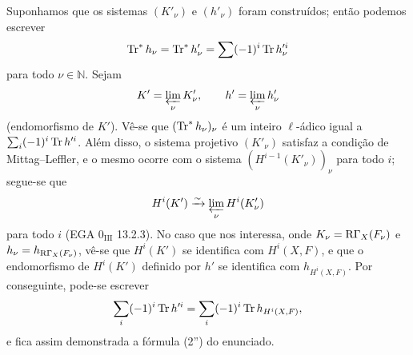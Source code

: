 Suponhamos que os sistemas $(K'_\nu)$ e $(h'_\nu)$ foram construídos; então podemos escrever
\[
\operatorname{Tr}^*h_\nu=\operatorname{Tr}^*h'_\nu=\sum(-1)^i\operatorname{Tr} h_\nu'^i
\]
para todo $\nu\in\mathbb N$. Sejam
\[
K'=\varprojlim_\nu K'_\nu,
\qquad h'=\varprojlim_\nu h'_\nu
\]
(endomorfismo de $K'$). Vê-se que $(\operatorname{Tr}^*h_\nu)_\nu$ é um inteiro $\ell$-ádico igual a $\sum_i(-1)^i\operatorname{Tr} h'^i$. Além disso, o sistema projetivo $(K'_\nu)$ satisfaz a condição de Mittag--Leffler, e o mesmo ocorre com o sistema $(H^{i-1}(K'_\nu))_\nu$ para todo $i$; segue-se que
\[
H^i(K')\xrightarrow{\sim}\varprojlim_\nu H^i(K'_\nu)
\]
para todo $i$ (EGA $0_{\mathrm{III}}$ 13.2.3). No caso que nos interessa, onde $K_\nu=\mathrm{R}\Gamma_X(F_\nu)$ e $h_\nu=h_{\mathrm{R}\Gamma_X(F_\nu)}$, vê-se que $H^i(K')$ se identifica com $H^i(X,F)$, e que o endomorfismo de $H^i(K')$ definido por $h'$ se identifica com $h_{H^i(X,F)}$. Por conseguinte, pode-se escrever
\[
\sum_i(-1)^i\operatorname{Tr} h'^i=
\sum_i(-1)^i\operatorname{Tr} h_{H^i(X,F)},
\]
e fica assim demonstrada a fórmula (2'') do enunciado.

